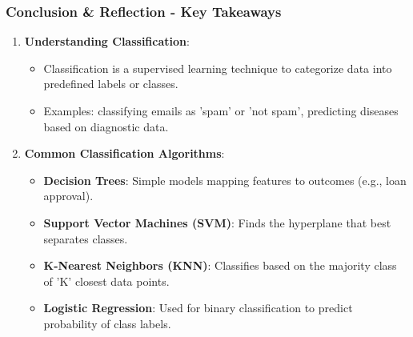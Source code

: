 \documentclass[aspectratio=169]{beamer}
\begin{document}
\begin{frame}[fragile]
    \frametitle{Conclusion \& Reflection - Key Takeaways}
    \begin{enumerate}
        \item \textbf{Understanding Classification}:
        \begin{itemize}
            \item Classification is a supervised learning technique to categorize data into predefined labels or classes.
            \item Examples: classifying emails as 'spam' or 'not spam', predicting diseases based on diagnostic data.
        \end{itemize}
        
        \item \textbf{Common Classification Algorithms}:
        \begin{itemize}
            \item \textbf{Decision Trees}: Simple models mapping features to outcomes (e.g., loan approval).
            \item \textbf{Support Vector Machines (SVM)}: Finds the hyperplane that best separates classes.
            \item \textbf{K-Nearest Neighbors (KNN)}: Classifies based on the majority class of 'K' closest data points.
            \item \textbf{Logistic Regression}: Used for binary classification to predict probability of class labels.
        \end{itemize}
    \end{enumerate}
\end{frame}
\end{document}

